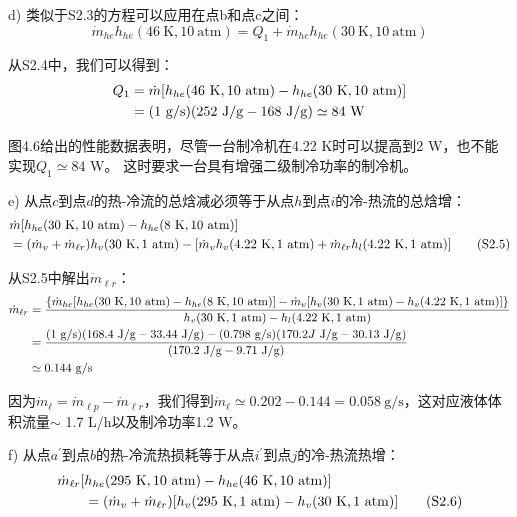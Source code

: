 d) 类似于S2.3的方程可以应用在点b和点c之间：
\begin{equation*}%
\dot{m}_{he}h_{he}(46\ \mathrm{K},10\ \mathrm{atm})=Q_1+\dot{m}_{he}h_{he}(30\ \mathrm{K},10\ \mathrm{atm})
\end{equation*}

从S2.4中，我们可以得到：
\begin{align*}%
Q_1&=\dot{m}[h_{he}(46\ \mathrm{K},10\ \mathrm{atm})-h_{he}(30\ \mathrm{K},10\ \mathrm{atm})]\\\notag
&=(1\ \mathrm{g/s})(252\ \mathrm{J/g}-168\ \mathrm{J/g})\simeq 84\ \mathrm{W}
\end{align*}

图4.6给出的性能数据表明，尽管一台制冷机在4.22 K时可以提高到2 W，也不能实现$Q_1\simeq 84$ W。
这时要求一台具有增强二级制冷功率的制冷机。

e) 从点$c$到点$d$的热-冷流的总焓减必须等于从点$h$到点$i$的冷-热流的总焓增：
\begin{align*}%
&\dot{m}[h_{he}(30\ \mathrm{K},10\ \mathrm{atm})-h_{he}(8\ \mathrm{K},10\ \mathrm{atm})]\\\notag
&=(\dot{m}_v+\dot{m}_{\ell r})h_v(30\ \mathrm{K},1\ \mathrm{atm})-[\dot{m}_vh_v(4.22\ \mathrm{K},1\ \mathrm{atm})+\dot{m}_{\ell r}h_l(4.22\ \mathrm{K},1\ \mathrm{atm})] \tag{S2.5}
\end{align*}

从S2.5中解出$\dot{m}_{\ell r}$：
\begin{align*}%
\dot{m}_{\ell r}&=\frac{\{\dot{m}_{he}[h_{he}(30\ \mathrm{K},10\ \mathrm{atm})-h_{he}(8\ \mathrm{K},10\ \mathrm{atm})]-\dot{m}_v[h_v(30\ \mathrm{K},1\ \mathrm{atm})-h_{v}(4.22\ \mathrm{K},1\ \mathrm{atm})]\}}{h_v(30\ \mathrm{K},1\ \mathrm{atm})-h_{l}(4.22\ \mathrm{K},1\ \mathrm{atm})}\\\notag
&=\frac{(1\ \mathrm{g/s})(168.4\ \mathrm{J/g}-33.44\ \mathrm{J/g})-(0.798 \ \mathrm{g/s})(170.2J\ \mathrm{J/g}-30.13\ \mathrm{J/g})}{(170.2\ \mathrm{J/g}-9.71\ \mathrm{J/g})}\\\notag
&\simeq 0.144 \ \mathrm{g/s}
\end{align*}

因为$\dot{m}_{\ell}=\dot{m}_{\ell p}-\dot{m}_{\ell r}$，我们得到$\dot{m}_{\ell}\simeq 0.202-0.144=0.058\ \mathrm{g/s}$，这对应液体体积流量$\sim$ 1.7 L/h以及制冷功率1.2 W。

f) 从点$a^\prime$到点$b$的热-冷流热损耗等于从点$i^\prime$到点$j$的冷-热流热增：
\begin{align*}%
\dot{m}_{\ell r}[&h_{he}(295\ \mathrm{K},10\ \mathrm{atm})-h_{he}(46\ \mathrm{K},10\ \mathrm{atm})]\\\notag
&=(\dot{m}_v+\dot{m}_{\ell r})[h_v(295\ \mathrm{K},1\ \mathrm{atm})-h_{v}(30\ \mathrm{K},1\ \mathrm{atm})] \tag{S2.6}
\end{align*}

